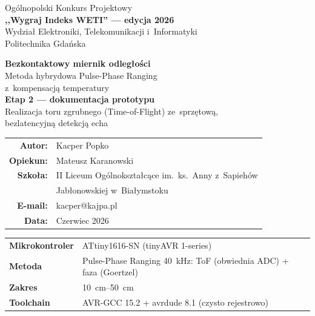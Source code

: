 \documentclass[a4paper,11pt]{article}
\begin{document}
\begin{titlepage}
	\centering
	\vspace*{1.5cm}

	{\Large Ogólnopolski Konkurs Projektowy}\\[0.3cm]
	{\Large\textbf{,,Wygraj Indeks WETI'' --- edycja 2026}}\\[0.2cm]
	{\large Wydział Elektroniki, Telekomunikacji i~Informatyki\\
		Politechnika Gdańska}

	\vspace{1.5cm}

	{\Huge\bfseries Bezkontaktowy miernik odległości}\\[0.5cm]
	{\Large Metoda hybrydowa Pulse-Phase Ranging\\z~kompensacją temperatury}\\[0.4cm]
	{\Large \textbf{Etap 2 --- dokumentacja prototypu}}\\[0.3cm]
	{\large Realizacja toru zgrubnego (Time-of-Flight) ze~sprzętową,\\
		bezlatencyjną detekcją echa}

	\vspace{2.0cm}

	{\large
		\begin{tabular}{rl}
			\textbf{Autor:}    & Kacper Popko \\
			\textbf{Opiekun:}  & Mateusz Karanowski \\
			\textbf{Szkoła:}   & II Liceum Ogólnokształcące im.\ ks.\ Anny z~Sapiehów \\
			                   & Jabłonowskiej w~Białymstoku \\
			\textbf{E-mail:}   & kacper@kajpa.pl \\
			\textbf{Data:}     & Czerwiec 2026 \\
		\end{tabular}
	}

	\vspace{1.5cm}

	\begin{tabular}{ll}
		\toprule
		\textbf{Mikrokontroler} & ATtiny1616-SN (tinyAVR 1-series) \\
		\textbf{Metoda} & Pulse-Phase Ranging \SI{40}{\kilo\hertz}: ToF (obwiednia ADC) + faza (Goertzel) \\
		\textbf{Zakres} & \SIrange{10}{50}{\centi\metre} \\
		\textbf{Toolchain} & AVR-GCC 15.2 + avrdude 8.1 (czysto rejestrowo) \\
		\bottomrule
	\end{tabular}

	\vfill
\end{titlepage}
\end{document}
